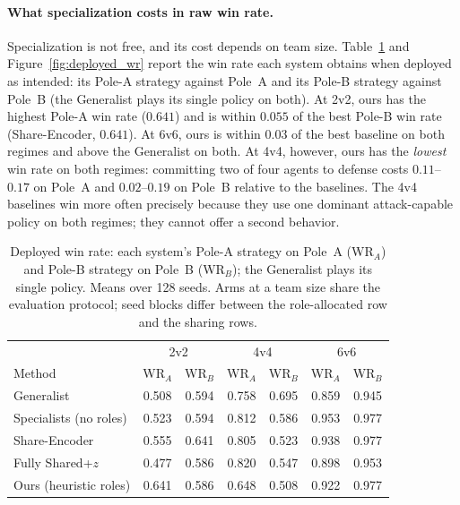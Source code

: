 \paragraph{What specialization costs in raw win rate.}
Specialization is not free, and its cost depends on team size.
Table~\ref{tab:deployed_wr} and Figure~\ref{fig:deployed_wr} report the win
rate each system obtains when
deployed as intended: its Pole-A strategy against Pole~A and its Pole-B
strategy against Pole~B (the Generalist plays its single policy on both).
At 2v2, ours has the highest Pole-A win rate (\(0.641\)) and is within
\(0.055\) of the best Pole-B win rate (Share-Encoder, \(0.641\)). At 6v6, ours is within \(0.03\) of the best baseline
on both regimes and above the Generalist on both. At 4v4, however, ours has
the \emph{lowest} win rate on both regimes: committing two of four agents to
defense costs \(0.11\)--\(0.17\) on Pole~A and \(0.02\)--\(0.19\) on Pole~B
relative to the baselines. The 4v4 baselines win more often precisely
because they use one dominant attack-capable policy on both regimes; they
cannot offer a second behavior.

\begin{table}[t]
\centering
\caption{Deployed win rate: each system's Pole-A strategy on Pole~A
(WR$_A$) and Pole-B strategy on Pole~B (WR$_B$); the Generalist plays its
single policy. Means over 128 seeds. Arms at a team size share the
evaluation protocol; seed blocks differ between the role-allocated row and
the sharing rows.}
\label{tab:deployed_wr}
\footnotesize
\setlength{\tabcolsep}{3pt}
\begin{tabular}{@{}lcccccc@{}}
\hline
& \multicolumn{2}{c}{2v2} & \multicolumn{2}{c}{4v4} & \multicolumn{2}{c}{6v6} \\
Method & WR$_A$ & WR$_B$ & WR$_A$ & WR$_B$ & WR$_A$ & WR$_B$ \\
\hline
Generalist             & 0.508 & 0.594 & 0.758 & 0.695 & 0.859 & 0.945 \\
Specialists (no roles) & 0.523 & 0.594 & 0.812 & 0.586 & 0.953 & 0.977 \\
Share-Encoder          & 0.555 & 0.641 & 0.805 & 0.523 & 0.938 & 0.977 \\
Fully Shared+$z$       & 0.477 & 0.586 & 0.820 & 0.547 & 0.898 & 0.953 \\
Ours (heuristic roles) & 0.641 & 0.586 & 0.648 & 0.508 & 0.922 & 0.977 \\
\hline
\end{tabular}
\end{table}

